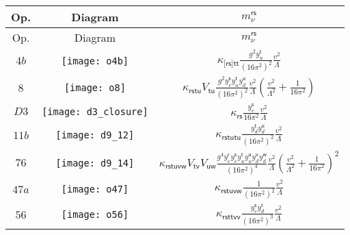 \begin{longtable}[t]{ccc}
  \toprule
  Op. & Diagram & $m_{\nu}^{\textsf{rs}}$ \\
  \midrule \endfirsthead \toprule
  Op. & Diagram & $m_{\nu}^{\textsf{rs}}$ \\
  \midrule \endhead $4b$ &
\begin{minipage}{0.2\linewidth}
  \centering
  \texttt{[image: o4b]}
\end{minipage}
  & $\displaystyle \kappa_{\textsf{[rs]tt}} \frac{g^{2} y_u^{\textsf{t}}}{(16\pi^{2})^{2}} \frac{v^{2}}{\Lambda}$  \\
    $8$ &
    \begin{minipage}{0.2\linewidth}
        \centering
        \texttt{[image: o8]}
      \end{minipage} & $\displaystyle \kappa_{\textsf{rstu}} V_{\textsf{tu}} \frac{g^{2} y_{e}^{\textsf{s}} y_{u}^{\textsf{t}} y_{d}^{\textsf{u}}}{(16\pi^{2})^{2}} \frac{v^{2}}{\Lambda} \left( \frac{v^{2}}{\Lambda^{2}} + \frac{1}{16 \pi^{2}}\right)$ \\
    $D3$ &
      \begin{minipage}{0.2\linewidth}
        \centering
        \texttt{[image: d3\_closure]}
      \end{minipage} & $\displaystyle \kappa_{\textsf{rs}} \frac{y_{e}^{\textsf{s}}}{16\pi^{2}}  \frac{v^{2}}{\Lambda}$ \\
  $11b$ &
          \begin{minipage}{0.3\linewidth}
            \centering
            \texttt{[image: d9\_12]}
          \end{minipage}
        & $\displaystyle \kappa_{\textsf{rstutu}} \frac{y_d^{\textsf{t}} y_d^{\textsf{u}}}{(16\pi^{2})^{2}} \frac{v^{2}}{\Lambda}$ \\
    $76$ &
\begin{minipage}{0.3\linewidth}
  \centering
  \texttt{[image: d9\_14]}
\end{minipage}
  & $\displaystyle \kappa_{\textsf{rstuvw}} V_{\textsf{tv}} V_{\textsf{uw}} \frac{g^{4} y^{\textsf{r}}_{e} y^{\textsf{s}}_{e} y_{u}^{\textsf{t}} y_{u}^{\textsf{u}} y_{d}^{\textsf{v}} y_{d}^{\textsf{w}}}{(16\pi^{2})^{4}} \frac{v^{2}}{\Lambda} \left(\frac{v^{2}}{\Lambda^{2}} + \frac{1}{16\pi^{2}} \right)^{2} $ \\
    $47a$ &
    \begin{minipage}{0.2\linewidth}
        \centering
        \texttt{[image: o47]}
      \end{minipage} & $\displaystyle \kappa_{\textsf{rstuvw}}\frac{1}{(16\pi^{2})^{2}} \frac{v^{2}}{\Lambda}$ \\
  $56$ &
 \begin{minipage}{0.2\linewidth}
  \centering
  \texttt{[image: o56]}
\end{minipage}
  & $\displaystyle \kappa_{\textsf{rsttvv}}\frac{y_{e}^{\textsf{s}} y_{d}^{\textsf{t}}}{(16\pi^{2})^{3}} \frac{v^{2}}{\Lambda}$ \\
  \bottomrule
\end{longtable}

